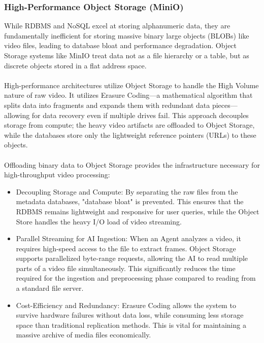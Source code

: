 \subsubsection*{High-Performance Object Storage (MiniO)}
While RDBMS and NoSQL excel at storing alphanumeric data, they are fundamentally inefficient for storing massive binary large objects (BLOBs) like video files, leading to database bloat and performance degradation. Object Storage systems like MinIO treat data not as a file hierarchy or a table, but as discrete objects stored in a flat address space.
\\\\High-performance architectures utilize Object Storage to handle the High Volume nature of raw video. It utilizes Erasure Coding—a mathematical algorithm that splits data into fragments and expands them with redundant data pieces—allowing for data recovery even if multiple drives fail. This approach decouples storage from compute; the heavy video artifacts are offloaded to Object Storage, while the databases store only the lightweight reference pointers (URLs) to these objects.\\\\
Offloading binary data to Object Storage provides the infrastructure necessary for high-throughput video processing:
\begin{itemize}
    \item Decoupling Storage and Compute: By separating the raw files from the metadata databases, "database bloat" is prevented. This ensures that the RDBMS remains lightweight and responsive for user queries, while the Object Store handles the heavy I/O load of video streaming.
    \item Parallel Streaming for AI Ingestion: When an Agent analyzes a video, it requires high-speed access to the file to extract frames. Object Storage supports parallelized byte-range requests, allowing the AI to read multiple parts of a video file simultaneously. This significantly reduces the time required for the ingestion and preprocessing phase compared to reading from a standard file server.
    \item Cost-Efficiency and Redundancy: Erasure Coding allows the system to survive hardware failures without data loss, while consuming less storage space than traditional replication methods. This is vital for maintaining a massive archive of media files economically.
\end{itemize}
